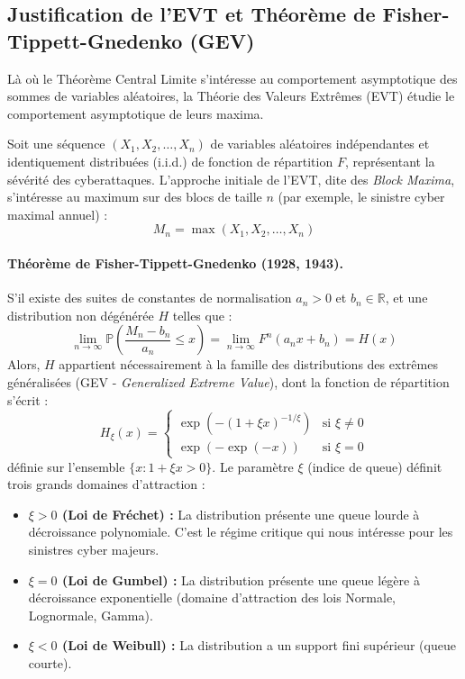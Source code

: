 \documentclass[11pt,a4paper]{article}
\theoremstyle{navystyle}
\theoremstyle{navydef}
\begin{document}
\subsection{Justification de l'EVT et Théorème de Fisher-Tippett-Gnedenko (GEV)}

Là où le Théorème Central Limite s'intéresse au comportement asymptotique des sommes de variables aléatoires, la Théorie des Valeurs Extrêmes (EVT) étudie le comportement asymptotique de leurs maxima. 

Soit une séquence $(X_1, X_2, \dots, X_n)$ de variables aléatoires indépendantes et identiquement distribuées (i.i.d.) de fonction de répartition $F$, représentant la sévérité des cyberattaques. L'approche initiale de l'EVT, dite des \textit{Block Maxima}, s'intéresse au maximum sur des blocs de taille $n$ (par exemple, le sinistre cyber maximal annuel) :
\begin{equation}
M_n = \max(X_1, X_2, \dots, X_n)
\end{equation}

\paragraph{Théorème de Fisher-Tippett-Gnedenko (1928, 1943).} S'il existe des suites de constantes de normalisation $a_n > 0$ et $b_n \in \mathbb{R}$, et une distribution non dégénérée $H$ telles que :
\begin{equation}
\lim_{n \to \infty} \mathbb{P}\left( \frac{M_n - b_n}{a_n} \le x \right) = \lim_{n \to \infty} F^n(a_n x + b_n) = H(x)
\end{equation}
Alors, $H$ appartient nécessairement à la famille des distributions des extrêmes généralisées (GEV - \textit{Generalized Extreme Value}), dont la fonction de répartition s'écrit :
\begin{equation}
H_{\xi}(x) = 
\begin{cases} 
\exp\left(-\left(1 + \xi x \right)^{-1/\xi}\right) & \text{si } \xi \neq 0 \\
\exp\left(-\exp(-x)\right) & \text{si } \xi = 0 
\end{cases}
\end{equation}
définie sur l'ensemble $\{x : 1 + \xi x > 0\}$. Le paramètre $\xi$ (indice de queue) définit trois grands domaines d'attraction :
\begin{itemize}
    \item \textbf{$\xi > 0$ (Loi de Fréchet) :} La distribution présente une queue lourde à décroissance polynomiale. C'est le régime critique qui nous intéresse pour les sinistres cyber majeurs.
    \item \textbf{$\xi = 0$ (Loi de Gumbel) :} La distribution présente une queue légère à décroissance exponentielle (domaine d'attraction des lois Normale, Lognormale, Gamma).
    \item \textbf{$\xi < 0$ (Loi de Weibull) :} La distribution a un support fini supérieur (queue courte).
\end{itemize}
\end{document}
